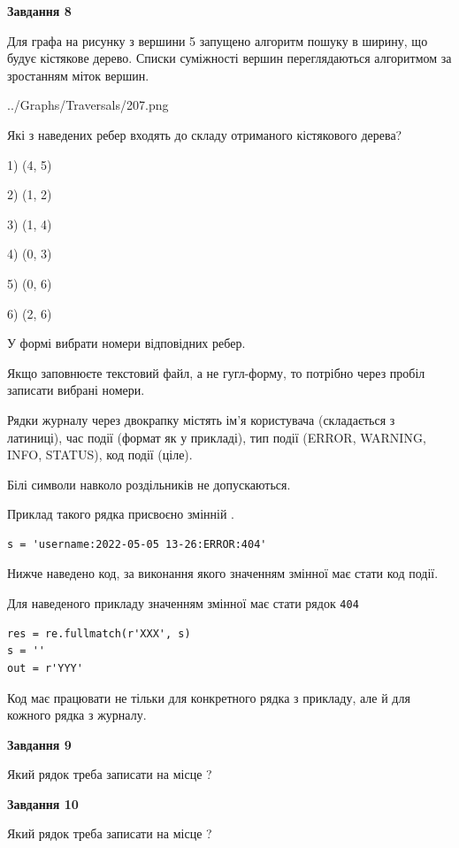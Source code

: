 \documentclass[12pt, ukrainian]{article}
\def\code#1{\Verb!#1!}
\begin{document}
{\begin {large}
{\begin {center}\textbf{Завдання 8}\end {center}}\par
Для графа на рисунку з вершини 5 запущено алгоритм пошуку в ширину, що будує кістякове дерево. Списки суміжності вершин переглядаються алгоритмом за зростанням міток вершин.\par
\begin{center}
	{../Graphs/Traversals/207.png}
\end{center}
\par Які з наведених ребер входять до складу отриманого кістякового дерева?\par
1) (4, 5)\par
2) (1, 2)\par
3) (1, 4)\par
4) (0, 3)\par
5) (0, 6)\par
6) (2, 6)\par
{\vskip 15pt} У формі вибрати номери відповідних ребер.


Якщо заповнюєте текстовий файл, а не гугл-форму, то потрібно через пробіл записа\-ти вибрані номери.\par
\newpage


Рядки журналу через двокрапку містять ім'я користувача (складається з латиниці), час події (фор\-мат як у прикладі), тип події (ERROR, WARNING, INFO, STATUS), код події (ціле).

Білі символи навколо роздільників не допускаються.

Приклад такого рядка присвоєно змінній .



\begin{verbatim}
s = 'username:2022-05-05 13-26:ERROR:404'
\end{verbatim}


Нижче наведено код, за виконання якого значенням змінної  має стати код події.

Для наведеного прикладу значенням змінної  має стати рядок \code{404}



\begin{verbatim}
res = re.fullmatch(r'XXX', s)
s = ''
out = r'YYY'
\end{verbatim}


Код має працювати не тільки для конкретного рядка з прикладу, але й для кожного рядка з журналу.

{\begin {center}\textbf{Завдання 9}\end {center}}\par
Який рядок треба записати на місце  ?\par
\vspace{5mm}


{\begin {center}\textbf{Завдання 10}\end {center}}\par
Який рядок треба записати на місце  ?\par


\newpage


\end {large}}
\end{document}

